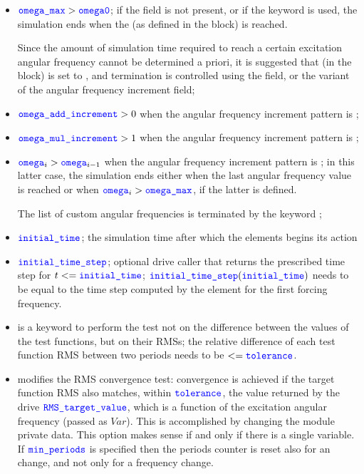 \begin{itemize}
\item $\textcolor{blue}{\texttt{omega\_max}} > \textcolor{blue}{\texttt{omega0}}$; if the  field is not present, or if the keyword  is used, the simulation ends when the  (as defined in the  block) is reached.

Since the amount of simulation time required to reach a certain excitation angular frequency cannot be determined a priori, it is suggested that  (in the  block) is set to , and termination is controlled using the  field, or the  variant of the angular frequency increment field;

\item $\textcolor{blue}{\texttt{omega\_add\_increment}} > 0$ when the angular frequency increment pattern is ;

\item $\textcolor{blue}{\texttt{omega\_mul\_increment}} > 1$ when the angular frequency increment pattern is ;

\item $\textcolor{blue}{\texttt{omega}}_i > \textcolor{blue}{\texttt{omega}}_{i-1}$ when the angular frequency increment pattern is ; in this latter case, the simulation ends either when the last angular frequency value is reached or when $\textcolor{blue}{\texttt{omega}}_i > \textcolor{blue}{\texttt{omega\_max}}$, if the latter is defined.

The list of custom angular frequencies is terminated by the keyword ;

\item $\textcolor{blue}{\texttt{initial\_time}}$; the simulation time after which the elements begins its action

\item $\textcolor{blue}{\texttt{initial\_time\_step}}$; optional drive caller that returns the prescribed time step for $t<=\textcolor{blue}{\texttt{initial\_time}}$; $\textcolor{blue}{\texttt{initial\_time\_step}}(\textcolor{blue}{\texttt{initial\_time}})$
needs to be equal to the time step computed by the element for the first forcing frequency.

\item {} is a keyword to perform the test not on the difference between the values of the test functions,
but on their RMSs; the relative difference of each test function RMS between two periods needs to be
$<=\textcolor{blue}{\texttt{tolerance}}$.

\item {} modifies the RMS convergence test: convergence is achieved if the target function RMS 
also matches, within $\textcolor{blue}{\texttt{tolerance}}$, the value returned by the drive $\textcolor{blue}{\texttt{RMS\_target\_value}}$, which is a function of the excitation angular frequency  (passed as $Var$). This is
accomplished by changing the module  private data. This option makes sense if and only if
there is a single  variable. If $\textcolor{blue}{\texttt{min\_periods}}$ is specified then the periods counter
is reset also for an  change, and not only for a frequency change.


\end{itemize}
